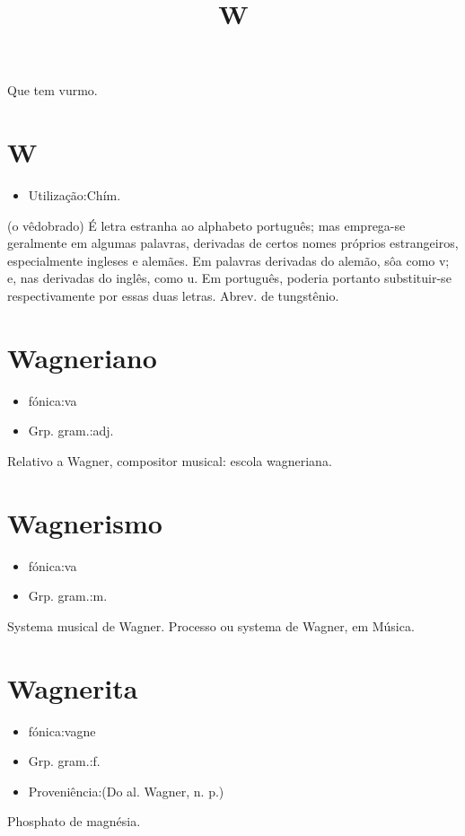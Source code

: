 \documentclass{article}
\title{W}
\begin{document}
Que tem vurmo.
\section{W}
\begin{itemize}
\item {Utilização:Chím.}
\end{itemize}
(o \textunderscore vê\textunderscore  dobrado)
É letra estranha ao alphabeto português; mas emprega-se geralmente em algumas palavras, derivadas de certos nomes próprios estrangeiros, especialmente ingleses e alemães.
Em palavras derivadas do alemão, sôa como \textunderscore v\textunderscore ; e, nas derivadas do inglês, como \textunderscore u\textunderscore . Em português, poderia portanto substituir-se respectivamente por essas duas letras.
Abrev. de \textunderscore tungstênio\textunderscore .
\section{Wagneriano}
\begin{itemize}
\item {fónica:va}
\end{itemize}
\begin{itemize}
\item {Grp. gram.:adj.}
\end{itemize}
Relativo a Wagner, compositor musical: \textunderscore escola wagneriana\textunderscore .
\section{Wagnerismo}
\begin{itemize}
\item {fónica:va}
\end{itemize}
\begin{itemize}
\item {Grp. gram.:m.}
\end{itemize}
Systema musical de Wagner.
Processo ou systema de Wagner, em Música.
\section{Wagnerita}
\begin{itemize}
\item {fónica:vagne}
\end{itemize}
\begin{itemize}
\item {Grp. gram.:f.}
\end{itemize}
\begin{itemize}
\item {Proveniência:(Do al. \textunderscore Wagner\textunderscore , n. p.)}
\end{itemize}
Phosphato de magnésia.
\end{document}
